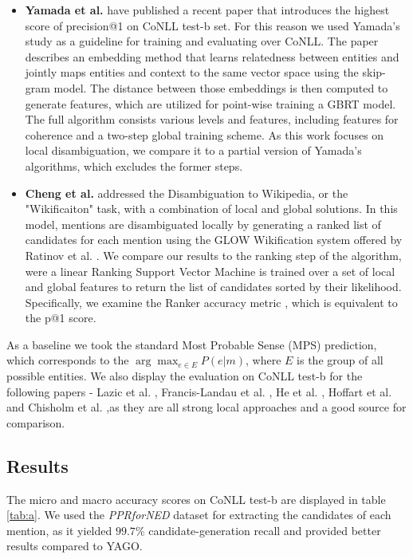 \documentclass[11pt]{article}
\begin{document}
	\begin{itemize} 
		\item  \textbf{Yamada et al.} \cite{Yamada2016} have published a recent paper that introduces the highest score of precision@1 on CoNLL test-b set. For this reason we used Yamada's study as a guideline for training and evaluating over CoNLL. The paper describes an embedding method that learns relatedness between entities and jointly maps entities and context to the same vector space using the skip-gram model. The distance between those embeddings is then computed to generate features, which are utilized for point-wise training a GBRT model. The full algorithm consists various levels and features, including features for coherence and a two-step global training scheme. As this work focuses on local disambiguation, we compare it to a partial version of Yamada's algorithms, which excludes the former steps.
		
		\item \textbf{Cheng et al.} \cite{Cheng2013} addressed the Disambiguation to Wikipedia, or the "Wikificaiton" task, with a combination of local and global solutions. In this model, mentions are disambiguated locally by generating a ranked list of candidates for each mention using the GLOW Wikification system offered by Ratinov et al. \cite{Ratinov2011}. We compare our results to the ranking step of the algorithm, were a linear Ranking Support Vector Machine is trained over a set of local and global features to return the list of candidates sorted by their likelihood. Specifically, we examine the Ranker accuracy metric , which is equivalent to the p@1 score.
		
	\end{itemize}
	
	As a baseline we took the standard Most Probable Sense (MPS) prediction, which corresponds to the $\arg\max_{e\in{{E}}}{P(e|m)}$, where $E$ is the group of all possible entities.
	We also display the evaluation on CoNLL test-b for the following papers - Lazic et al. \cite{Lazic2015}, Francis-Landau et al. \cite{Francis-Landau2016}, He et al. \cite{He2013}, Hoffart et al. \cite{hoffart2011robust} and Chisholm et al. \cite{Chisholm2015} ,as they are all strong local approaches and a good source for comparison.
		
	\subsection{Results}
	
	The micro and macro accuracy scores on CoNLL test-b are displayed in table \ref{tab:a}. We used the \textit{PPRforNED} dataset \cite{Pershina2015} for extracting the candidates of each mention, as it yielded $99.7$\% candidate-generation recall and provided better results compared to YAGO. 
	
\end{document}
